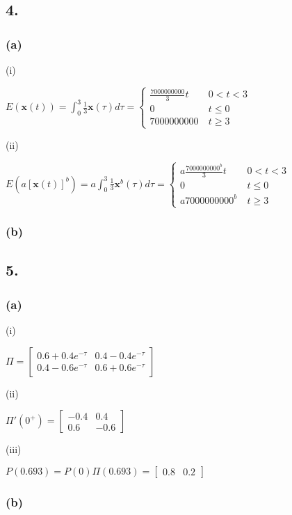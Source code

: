 \documentclass{article}
\begin{document}
\subsection*{4.}
\subsubsection*{(a)}
(i)\par
$E(\mathbf{x}(t))=\int_{0}^{3}\frac{1}{3}\mathbf{x}(\tau)d\tau=\begin{cases}
\frac{7000000000}{3}t \ & 0<t<3\\
0 \ & t \leq 0\\
7000000000 \ & t \geq 3
\end{cases}$\par
(ii)\par
$E(a[\mathbf{x}(t)]^b)=a\int_{0}^{3}\frac{1}{3}\mathbf{x}^b(\tau)d\tau=\begin{cases}
a\frac{7000000000^b}{3}t \ & 0<t<3\\
0 \ & t \leq 0\\
a7000000000^b \ & t \geq 3
\end{cases}$\par
\subsubsection*{(b)}

\subsection*{5.}
\subsubsection*{(a)}
(i)\par
$\Pi=\begin{bmatrix}
0.6+0.4e^{-\tau} & 0.4-0.4e^{-\tau}\\
0.4-0.6e^{-\tau} & 0.6+0.6e^{-\tau}
\end{bmatrix}$\par
(ii)\par
$\Pi'(0^{+})=\begin{bmatrix}
-0.4 & 0.4\\
0.6 & -0.6
\end{bmatrix}$\par
(iii)\par
$P(0.693)=P(0)\Pi(0.693)=\begin{bmatrix}
0.8 & 0.2
\end{bmatrix}$
\subsubsection*{(b)}
\end{document}
